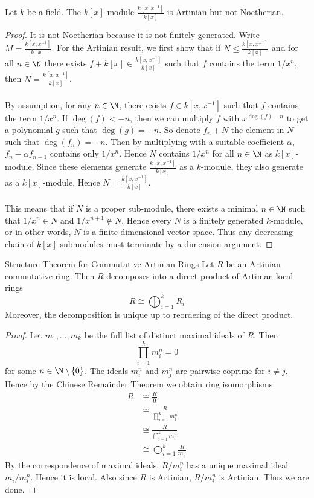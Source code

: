\documentclass[a4paper]{article}
\begin{document}
\begin{eg}{}{} Let $k$ be a field. The $k[x]$-module $\frac{k[x,x^{-1}]}{k[x]}$ is Artinian but not Noetherian. \tcbline
\begin{proof}
It is not Noetherian because it is not finitely generated. Write $M=\frac{k[x,x^{-1}]}{k[x]}$. For the Artinian result, we first show that if $N\leq\frac{k[x,x^{-1}]}{k[x]}$ and for all $n\in\N$ there exists $f+k[x]\in\frac{k[x,x^{-1}]}{k[x]}$ such that $f$ contains the term $1/x^n$, then $N=\frac{k[x,x^{-1}]}{k[x]}$. \\~\\

By assumption, for any $n\in\N$, there exists $f\in k[x,x^{-1}]$ such that $f$ contains the term $1/x^n$. If $\deg(f)<-n$, then we can multiply $f$ with $x^{\deg(f)-n}$ to get a polynomial $g$ such that $\deg(g)=-n$. So denote $f_n+N$ the element in $N$ such that $\deg(f_n)=-n$. Then by multiplying with a suitable coefficient $\alpha$, $f_n-\alpha f_{n-1}$ contains only $1/x^n$. Hence $N$ contains $1/x^n$ for all $n\in\N$ as $k[x]$-module. Since these elements generate $\frac{k[x,x^{-1}]}{k[x]}$ as a $k$-module, they also generate as a $k[x]$-module. Hence $N=\frac{k[x,x^{-1}]}{k[x]}$. \\~\\

This means that if $N$ is a proper sub-module, there exists a minimal $n\in\N$ such that $1/x^n\in N$ and $1/x^{n+1}\notin N$. Hence every $N$ is a finitely generated $k$-module, or in other words, $N$ is a finite dimensional vector space. Thus any decreasing chain of $k[x]$-submodules must terminate by a dimension argument. 
\end{proof}
\end{eg}

\begin{thm}{Structure Theorem for Commutative Artinian Rings}{} Let $R$ be an Artinian commutative ring. Then $R$ decomposes into a direct product of Artinian local rings $$R\cong\bigoplus_{i=1}^k R_i$$ Moreover, the decomposition is unique up to reordering of the direct product.  \tcbline
\begin{proof}
Let $m_1,\dots,m_k$ be the full list of distinct maximal ideals of $R$. Then $$\prod_{i=1}^km_i^n=0$$ for some $n\in\N\setminus\{0\}$. The ideals $m_i^n$ and $m_j^n$ are pairwise coprime for $i\neq j$. Hence by the Chinese Remainder Theorem we obtain ring isomorphisms 
\begin{align*}
R&\cong\frac{R}{0}\\
&\cong\frac{R}{\prod_{i=1}^km_i^n}\\
&\cong\frac{R}{\bigcap_{i=1}^km_i^n}\tag{$m_i^n$ and $m_j^n$ pairwise coprime}\\
&\cong\bigoplus_{i=1}^k\frac{R}{m_i^n}\tag{CRT}
\end{align*}
By the correspondence of maximal ideals, $R/m_i^n$ has a unique maximal ideal $m_i/m_i^n$. Hence it is local. Also since $R$ is Artinian, $R/m_i^n$ is Artinian. Thus we are done. 
\end{proof}
\end{thm}
\end{document}
